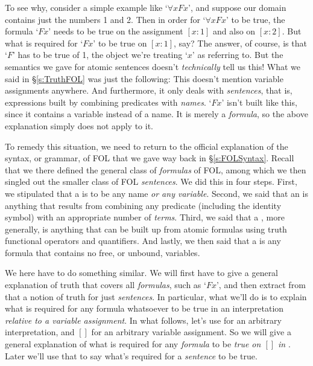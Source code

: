 To see why, consider a simple example like `$\forall xFx$', and suppose our domain contains just the numbers 1 and 2.  Then in order for `$\forall xFx$' to be true, the formula `$Fx$' needs to be true on the assignment $[x:1]$ and also on $[x:2]$.  But what is required for `$Fx$' to be true on $[x:1]$, say?  The answer, of course, is that `$F$' has to be true of 1, the object we're treating `$x$' as referring to.  But the semantics we gave for atomic sentences doesn't \emph{technically} tell us this!  What we said in \S\ref{s:TruthFOL} was just the following:
This doesn't mention variable assignments anywhere.  And furthermore, it only deals with \emph{sentences}, that is, expressions built by combining predicates with \emph{names}.  `$Fx$' isn't built like this, since it contains a variable instead of a name.  It is merely a \emph{formula}, so the above explanation simply does not apply to it.

To remedy this situation, we need to return to the official explanation of the syntax, or grammar, of FOL that we gave way back in \S\ref{s:FOLSyntax}.  Recall that we there defined the general class of \emph{formulas} of FOL, among which we then singled out the smaller class of FOL \emph{sentences}.  We did this in four steps.  First, we stipulated that a  is to be any name \emph{or any variable}.  Second, we said that an  is anything that results from combining any predicate (including the identity symbol) with an appropriate number of \emph{terms}. Third, we said that a , more generally, is anything that can be built up from atomic formulas using truth functional operators and quantifiers.  And lastly, we then said that a  is any formula that contains no free, or unbound, variables.

We here have to do something similar.  We will first have to give a general explanation of truth that covers all \emph{formulas}, such as `$Fx$', and then extract from that a notion of truth for just \emph{sentences}.  In particular, what we'll do is to explain what is required for any formula whatsoever to be true in an interpretation \emph{relative to a variable assignment}.  In what follows, let's use  for an arbitrary interpretation, and $[ ]$ for an arbitrary variable assignment.  So we will give a general explanation of what is required for any \emph{formula} to be \emph{true on $[]$ in }.  Later we'll use that to say what's required for a \emph{sentence} to be true.

